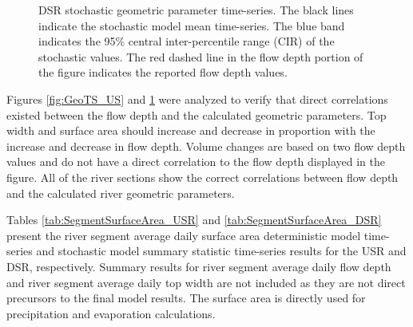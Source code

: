 \begin{linenumbers}
\begin{landscape}
\begin{figure}
\begin{subfigure}{0.7\textwidth}
		\end{subfigure}
		\caption[DSR stochastic geometric parameter time-series.]{DSR stochastic geometric parameter time-series. The black lines indicate the stochastic model mean time-series.  The blue band indicates the 95\% central inter-percentile range (CIR) of the stochastic values.  The red dashed line in the flow depth portion of the figure indicates the reported flow depth values.}
		\label{fig:GeoTS_DS}
	\end{figure}
\end{landscape}

Figures \ref{fig:GeoTS_US} and \ref{fig:GeoTS_DS} were analyzed to verify that direct correlations existed between the flow depth and the calculated geometric parameters.  Top width and surface area should increase and decrease in proportion with the increase and decrease in flow depth.  Volume changes are based on two flow depth values and do not have a direct correlation to the flow depth displayed in the figure.  All of the river sections show the correct correlations between flow depth and the calculated river geometric parameters.

Tables \ref{tab:SegmentSurfaceArea_USR} and \ref{tab:SegmentSurfaceArea_DSR} present the river segment average daily surface area deterministic model time-series and stochastic model summary statistic time-series results for the USR and DSR, respectively.  Summary results for river segment average daily flow depth and river segment average daily top width are not included as they are not direct precursors to the final model results.  The surface area is directly used for precipitation and evaporation calculations.


\end{linenumbers}
